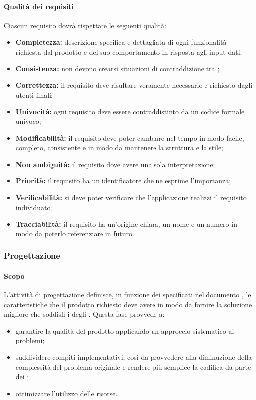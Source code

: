 \paragraph{Qualità dei requisiti}
Ciascun requisito dovrà rispettare le seguenti qualità:
\begin {itemize}
	\item \textbf{Completezza:} descrizione specifica e dettagliata di ogni funzionalità richiesta dal prodotto  e del suo comportamento in risposta agli input dati;
	\item \textbf{Consistenza:} non devono crearsi situazioni di contraddizione tra ;
	\item \textbf{Correttezza:} il requisito deve risultare veramente necessario e richiesto dagli utenti finali;
	\item \textbf{Univocità:} ogni requisito deve essere contraddistinto da un codice formale univoco;
	\item \textbf{Modificabilità:} il requisito deve poter cambiare nel tempo in modo facile, completo, consistente e in modo da mantenere la struttura e lo stile;
	\item \textbf{Non ambiguità:} il requisito dove avere una sola interpretazione;
	\item \textbf{Priorità:} il requisito ha un identificatore che ne esprime l'importanza;
	\item \textbf{Verificabilità:} si deve poter verificare che l'applicazione realizzi il requisito individuato;
	\item \textbf{Tracciabilità:} il requisito ha un'origine chiara, un nome e un numero in modo da poterlo referenziare in futuro.
\end{itemize}
\subsubsection{Progettazione}
\paragraph{Scopo}
L'attività di progettazione definisce, in funzione dei  specificati nel documento \AdR{}, le caratteristiche che il prodotto richiesto deve avere in modo da fornire la soluzione migliore che soddisfi i  degli . Questa fase provvede a:
\begin{itemize}
\item garantire la qualità del prodotto applicando un approccio sistematico ai problemi;
\item suddividere compiti implementativi, così da provvedere alla diminuzione della complessità del problema originale e rendere più semplice la codifica da parte dei \progrs{};
\item ottimizzare l'utilizzo delle risorse.
\end{itemize}
